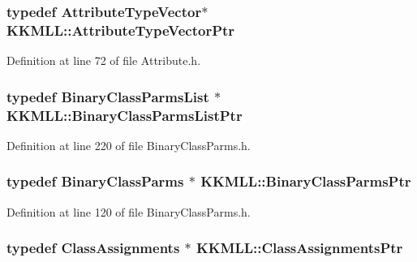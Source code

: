 \subsubsection[{\texorpdfstring{Attribute\+Type\+Vector\+Ptr}{AttributeTypeVectorPtr}}]{\setlength{\rightskip}{0pt plus 5cm}typedef {\bf Attribute\+Type\+Vector}$\ast$ {\bf K\+K\+M\+L\+L\+::\+Attribute\+Type\+Vector\+Ptr}}\hypertarget{namespace_k_k_m_l_l_aaac261e37ef0685bf17b486fd0498aa9}{}\label{namespace_k_k_m_l_l_aaac261e37ef0685bf17b486fd0498aa9}


Definition at line 72 of file Attribute.\+h.

\subsubsection[{\texorpdfstring{Binary\+Class\+Parms\+List\+Ptr}{BinaryClassParmsListPtr}}]{\setlength{\rightskip}{0pt plus 5cm}typedef {\bf Binary\+Class\+Parms\+List} $\ast$ {\bf K\+K\+M\+L\+L\+::\+Binary\+Class\+Parms\+List\+Ptr}}\hypertarget{namespace_k_k_m_l_l_a15376316ebec0ec5e4d1f11cfb06c15b}{}\label{namespace_k_k_m_l_l_a15376316ebec0ec5e4d1f11cfb06c15b}


Definition at line 220 of file Binary\+Class\+Parms.\+h.

\subsubsection[{\texorpdfstring{Binary\+Class\+Parms\+Ptr}{BinaryClassParmsPtr}}]{\setlength{\rightskip}{0pt plus 5cm}typedef {\bf Binary\+Class\+Parms} $\ast$ {\bf K\+K\+M\+L\+L\+::\+Binary\+Class\+Parms\+Ptr}}\hypertarget{namespace_k_k_m_l_l_aca399c0744e11553270ffaca507cfee7}{}\label{namespace_k_k_m_l_l_aca399c0744e11553270ffaca507cfee7}


Definition at line 120 of file Binary\+Class\+Parms.\+h.

\subsubsection[{\texorpdfstring{Class\+Assignments\+Ptr}{ClassAssignmentsPtr}}]{\setlength{\rightskip}{0pt plus 5cm}typedef {\bf Class\+Assignments} $\ast$ {\bf K\+K\+M\+L\+L\+::\+Class\+Assignments\+Ptr}}\hypertarget{namespace_k_k_m_l_l_ae085749533329dd0fe12b6221ad79b03}{}\label{namespace_k_k_m_l_l_ae085749533329dd0fe12b6221ad79b03}


